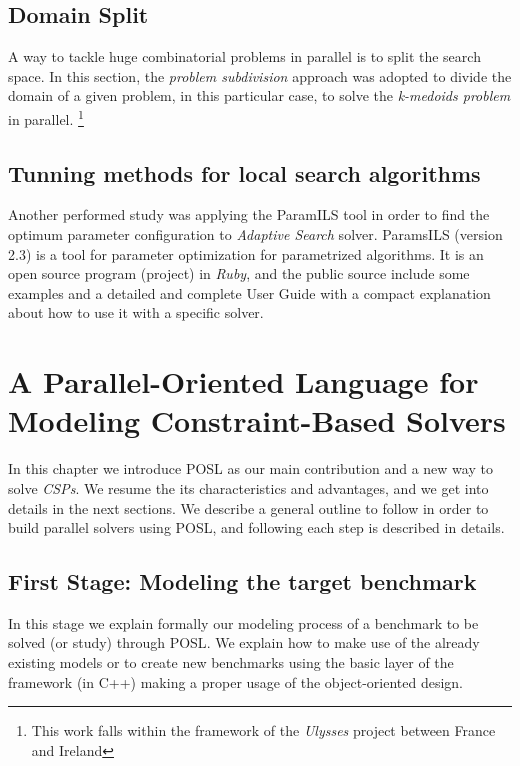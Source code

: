 \documentclass[a4paper]{book} %
\newcommand{\posl}{{\sc POSL}}
\newcommand{\csp}{\textit{CSP}}
\newcommand{\csps}{\csp\textit{s}}
\begin{document}
\section{Domain Split}

A way to tackle huge combinatorial problems in parallel is to split the search space. In this section, the {\it problem subdivision} approach was adopted to divide the domain of a given problem, in this particular case, to solve the {\it k-medoids problem} in parallel. \footnote{This work falls within the framework of the \textit{Ulysses} project between France and Ireland}

\section{Tunning methods for local search algorithms}

Another performed study was applying the {\sc ParamILS} tool in order to find the optimum parameter configuration to {\it Adaptive Search} solver. {\sc ParamsILS} (version 2.3) is a tool for parameter optimization for parametrized algorithms. %
It is an open source program (project) in {\it Ruby}, and the public source include some examples and a detailed and complete User Guide with a compact explanation about how to use it with a specific solver. %

\chapter{A Parallel-Oriented Language for Modeling Constraint-Based Solvers}

In this chapter we introduce \posl{} as our main contribution and a new way to solve \csps{}. We resume the its characteristics and advantages, and we get into details in the next sections. We describe a general outline to follow in order to build parallel solvers using \posl, and following each step is described in details.

\section{First Stage: Modeling the target benchmark}

In this stage we explain formally our modeling process of a benchmark to be solved (or study) through \posl{}. We explain how to make use of the already existing models or to create new benchmarks using the basic layer of the framework (in C++) making a proper usage of the object-oriented design.
\end{document}
